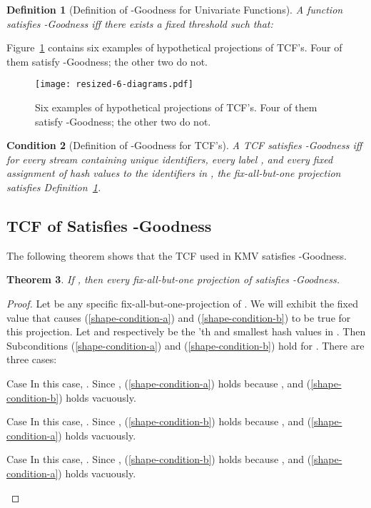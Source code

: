\documentclass{article}
\newenvironment{tighterdescription}{\begin{description}\setlength{\itemsep}{1pt}\setlength{\parskip}{1pt}}{\end{description}}
\newtheorem{theorem}{Theorem}[section]
\newtheorem{definition}[theorem]{Definition}
\newtheorem{condition}[theorem]{Condition}
\begin{document}
\begin{definition}[Definition of -Goodness for Univariate Functions]\label{def:good-shape}
A function  satisfies -Goodness iff there exists a fixed threshold  such that:

\end{definition}


\noindent Figure~\ref{fig:six-shape-plots}  contains six examples of hypothetical projections of TCF's. 
Four of them satisfy -Goodness; the other two do not. 

\label{app:figures}
\begin{figure}
\begin{center}
\texttt{[image: resized-6-diagrams.pdf]}
\end{center}
\caption{Six examples of hypothetical projections of TCF's. Four of them satisfy -Goodness; the other two do not.}
\label{fig:six-shape-plots}
\end{figure}






\begin{condition}[Definition of -Goodness for TCF's]\label{key-condition}
A TCF  satisfies -Goodness iff for every stream 
containing  unique identifiers, every label , and every fixed 
assignment  of hash values to the identifiers in ,
the fix-all-but-one projection  satisfies Definition~\ref{def:good-shape}.
\end{condition}


\subsection{TCF of  Satisfies -Goodness}\label{sec:kmv-sat}
The following theorem shows that the TCF used in KMV satisfies -Goodness. \begin{theorem}\label{thm:kmv-sat}
If , then every fix-all-but-one projection  of  satisfies -Goodness.
\end{theorem}
\begin{proof}
Let  be any specific fix-all-but-one-projection of .
We will exhibit the fixed value  that causes (\ref{shape-condition-a}) and (\ref{shape-condition-b})
to be true for this projection.
Let  and  respectively be the 'th and 
smallest hash values in . 
Then Subconditions (\ref{shape-condition-a}) and (\ref{shape-condition-b}) hold for
. There are three cases:
\begin{tighterdescription}
\item[Case ] 
In this case, 
. 
Since , 
(\ref{shape-condition-a}) holds because , and (\ref{shape-condition-b}) holds vacuously.
\item[Case ] 
In this case, 
. 
Since , 
(\ref{shape-condition-b}) holds because  , and (\ref{shape-condition-a}) holds vacuously.
\item[Case ] 
In this case, 
. 
Since , 
(\ref{shape-condition-b}) holds because  , and (\ref{shape-condition-a}) holds vacuously.
\end{tighterdescription}
\end{proof}
\end{document}
